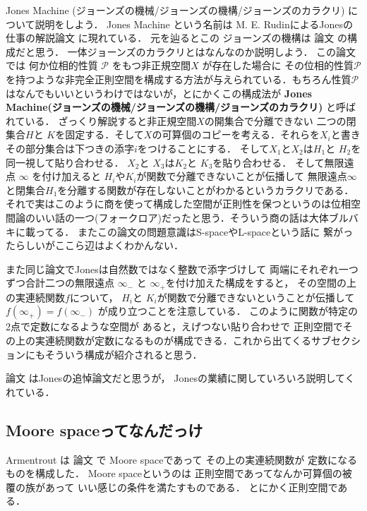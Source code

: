 \documentclass[leqno, a4paper, 12pt]{jsarticle}
\begin{document}
Jones Machine
(ジョーンズの機械/ジョーンズの機構/ジョーンズのカラクリ)
について説明をしよう．
Jones Machine という名前は
M. E. RudinによるJonesの仕事の解説論文
\cite{MR1617573}
に現れている．
元を辿るとこの
ジョーンズの機構は
論文
\cite{MR0413044}
の構成だと思う．
一体ジョーンズのカラクリとはなんなのか説明しよう．
この論文
\cite{MR0413044}
では
何か位相的性質
$\mathcal{P}$
をもつ非正規空間$X$
が存在した場合に
その位相的性質$\mathcal{P}$
を持つような非完全正則空間を構成する方法が与えられている．もちろん性質$\mathcal{P}$はなんでもいいというわけではないが，とにかくこの構成法が
\textbf{Jones Machine(ジョーンズの機械/ジョーンズの機構/ジョーンズのカラクリ)}
と呼ばれている．
ざっくり解説すると非正規空間$X$の開集合で分離できない
二つの閉集合$H$と
$K$を固定する．そして$X$の可算個のコピーを考える．それらを$X_{i}$と書きその部分集合は下つきの添字$i$をつけることにする．
そして$X_{1}$と$X_{2}$は$H_{1}$と
$H_{2}$を同一視して貼り合わせる．
$X_{2}$と
$X_{3}$は$K_{2}$と
$K_{3}$を貼り合わせる．
そして無限遠点
$\infty$
を付け加えると
$H_{i}$や$K_{i}$が関数で分離できないことが伝播して
無限遠点$\infty$
と閉集合$H_{1}$を分離する関数が存在しないことがわかるというカラクリである．それで実はこのように商を使って構成した空間が正則性を保つというのは位相空間論のいい話の一つ(フォークロア)だったと思う．そういう商の話は大体ブルバキに載ってる．
またこの論文の問題意識はS-spaceやL-spaceという話に
繋がったらしいがここら辺はよくわかんない．


また同じ論文\cite{MR0413044}でJonesは自然数ではなく整数で添字づけして
両端にそれぞれ一つずつ合計二つの無限遠点
$\infty_{-}$
と
$\infty_{+}$を付け加えた構成をすると，
その空間の上の実連続関数$f$について，
$H_{i}$と
$K_{i}$が関数で分離できないということが伝播して
$f(\infty_{+})=f(\infty_{-})$
が成り立つことを注意している．
このように関数が特定の2点で定数になるような空間が
あると，えげつない貼り合わせで
正則空間でその上の実連続関数が定数になるものが構成できる．これから出てくるサブセクションにもそういう構成が紹介されると思う．





論文
\cite{MR1802673}
はJonesの追悼論文だと思うが，
Jonesの業績に関していろいろ説明してくれている．

\subsection{Moore spaceってなんだっけ}
Armentrout
は
論文
\cite{MR0120615}
で
Moore spaceであって
その上の実連続関数が
定数になるものを構成した．
Moore spaceというのは
正則空間であってなんか可算個の被覆の族があって
いい感じの条件を満たすものである．
とにかく正則空間である．
\end{document}

